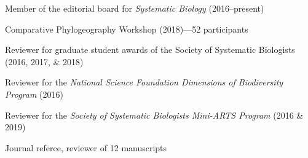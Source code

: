 \begin{veryTightItemize}
    \item Member of the editorial board for \emph{Systematic Biology}
        (2016--present)
    \item Comparative Phylogeography Workshop (2018)---52 participants
    \item Reviewer for graduate student awards of the Society of Systematic
        Biologists (2016, 2017, \& 2018)
    \item Reviewer for the \emph{National Science Foundation Dimensions of
            Biodiversity Program} (2016)
    \item Reviewer for the \emph{Society of Systematic Biologists Mini-ARTS
            Program} (2016 \& 2019)
    \item Journal referee, reviewer of 12 manuscripts
\end{veryTightItemize}
